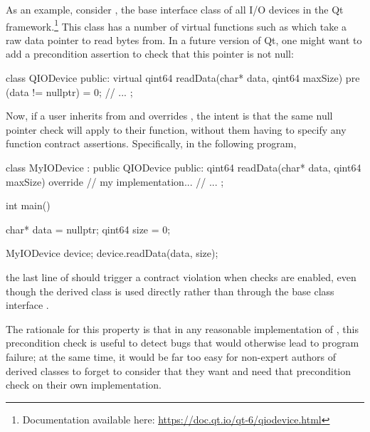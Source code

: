 As an example, consider , the base interface class of all I/O devices in the Qt framework.\footnote{Documentation available here: \url{https://doc.qt.io/qt-6/qiodevice.html}} This class has a number of virtual functions such as  which take a raw data pointer to read bytes from. In a future version of Qt, one might want to add a precondition assertion to check that this pointer is not null:
\begin{codeblock}
class QIODevice {
public:
  virtual qint64 readData(char* data, qint64 maxSize)
    pre (data != nullptr) = 0;
// ...
};
\end{codeblock}
Now, if a user inherits from  and overrides , the intent is that the same null pointer check will apply to their function, without them having to specify any function contract assertions. Specifically, in the following program,
\begin{codeblock}
class MyIODevice : public QIODevice {
public:
  qint64 readData(char* data, qint64 maxSize) override {
    // my implementation...
  }
  // ...
};

int main() {
  char* data = nullptr;
  qint64 size = 0;
  
  MyIODevice device;
  device.readData(data, size);
}
\end{codeblock}
the last line of  should trigger a contract violation when checks are enabled, even though the derived class  is used directly rather than through the base class interface . 

The rationale for this property is that in any reasonable implementation of , this precondition check is useful to detect bugs that would otherwise lead to program failure; at the same time, it would be far too easy for non-expert authors of derived classes to forget to consider that they want and need that precondition check on their own implementation.

